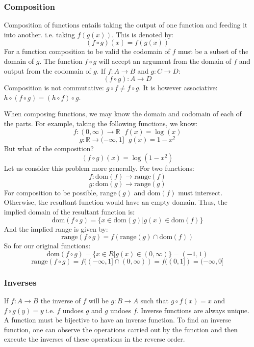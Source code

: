 \documentclass[12pt]{report}
\newcommand{\R}{\mathbb{R}}
\begin{document}
\begin{flushleft}
\subsubsection*{Composition}
Composition of functions entails taking the output of one function and feeding it into
another. i.e. taking \(f(g(x))\). This is denoted by:
\[(f \circ g)(x) = f(g(x))\]
For a function composition to be valid the codomain of \(f\) must be a subset of the
domain of \(g\). The function \(f \circ g\) will accept an argument from the domain
of \(f\) and output from the codomain of \(g\). If \(f: A \rightarrow B\) and 
\(g: C \rightarrow D\):
\[(f \circ g): A \rightarrow D\]
Composition is not commutative: \(g \circ f \neq f \circ g\). It is however
associative: \(h \circ (f \circ g) = (h \circ f) \circ g\).

\bigskip
When composing functions, we may know the domain and codomain of each of the parts.
For example, taking the following functions, we know:
\[f: (0, \infty) \rightarrow \R \:\:\: f(x) = \log(x)\]
\[g: \R \rightarrow (-\infty, 1] \:\:\: g(x) = 1 - x^2\]
But what of the composition?
\[(f \circ g)(x) = \log(1 - x^2)\]
Let us consider this problem more generally. For two functions:
\[f: \mathrm{dom}(f) \rightarrow \mathrm{range}(f)\]
\[g: \mathrm{dom}(g) \rightarrow \mathrm{range}(g)\]
For composition to be possible, \(\mathrm{range}(g)\) and \(\mathrm{dom}(f)\) must
intersect. Otherwise, the resultant function would have an empty domain. Thus, the implied
domain of the resultant function is:
\[\mathrm{dom}(f \circ g) = \{x \in \mathrm{dom}(g) | g(x) \in \mathrm{dom}(f)\}\]
And the implied range is given by:
\[\mathrm{range}(f \circ g) = f(\mathrm{range}(g) \cap \mathrm{dom}(f))\]
So for our original functions:
\[\mathrm{dom}(f \circ g) = \{x \in R | g(x) \in (0, \infty)\} = (-1, 1)\]
\[\mathrm{range}(f \circ g) = f((-\infty, 1] \cap (0, \infty)) = f((0, 1]) = (-\infty, 0]\]

\subsubsection*{Inverses}
If \(f: A \rightarrow B\) the inverse of \(f\) will be \(g: B \rightarrow A\)
such that \(g \circ f(x) = x\) and \(f \circ g(y) = y\) i.e. \(f\) undoes \(g\)
and \(g\) undoes \(f\). Inverse functions are always unique. A function must be bijective
to have an inverse function. To find an inverse function, one can observe the operations
carried out by the function and then execute the inverses of these operations in the 
reverse order.


\end{flushleft}
\end{document}
